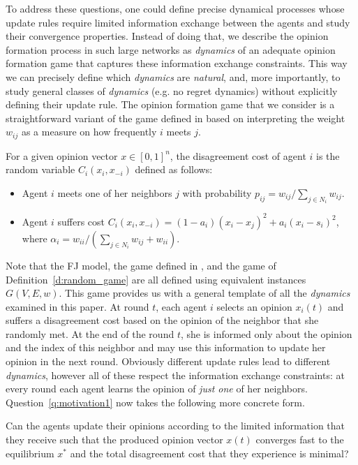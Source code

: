 To address these questions, one could define precise dynamical processes whose
update rules require limited information exchange between the agents and study
their convergence properties. Instead of doing that, we describe the opinion
formation process in such large networks as \emph{dynamics} of an adequate
opinion formation game that captures these information exchange constraints.
This way we can precisely define which \emph{dynamics} are \emph{natural}, and,
more importantly, to study general classes of \emph{dynamics} (e.g. no regret
dynamics) without explicitly defining their update rule.  The opinion formation
game that we consider is a straightforward variant of the game defined in
\cite{BKO11} based on interpreting the weight $w_{ij}$ as a measure on how
frequently $i$ meets $j$.
%
\begin{definition}\label{d:random_game}
  For a given opinion vector $x \in [0,1]^n$, the disagreement cost of agent
  $i$ is the random variable $C_i(x_i,x_{-i})$ defined as follows:
  \begin{itemize}
    \item Agent $i$ meets one of her neighbors $j$ with probability $p_{ij}=
      w_{ij}/\sum_{j\in N_i}w_{ij}$.
    \item Agent $i$ suffers cost $C_i(x_i , x_{-i}) = (1-a_i)(x_i-x_j)^2 +
      a_i(x_i-s_i)^2$, where $\alpha_i = w_{ii}/(\sum_{j\in
        N_i}w_{ij}+w_{ii})$.
  \end{itemize}
\end{definition}
%
Note that the FJ model, the game defined in \cite{BKO11}, and the game of
Definition~\ref{d:random_game} are all defined using equivalent instances
$G(V,E,w)$.  This game provides us with a general template of all the \emph{dynamics}
examined in this paper.  At round $t$, each agent $i$ selects an opinion
$x_i(t)$ and suffers a disagreement cost based on the opinion of the neighbor
that she randomly met.  At the end of the round $t$, she is informed only about
the opinion and the index of this neighbor and may use this information to
update her opinion in the next round.  Obviously different update rules lead to
different \emph{dynamics}, however all of these respect the information
exchange constraints: at every round each agent learns the opinion of \emph{just
  one} of her neighbors.  Question~\ref{q:motivation1} now takes the following
more concrete form.

\begin{question}\label{q:motivation2}
  Can the agents update their opinions according to the limited information
  that they receive such that the produced opinion vector $x(t)$ converges
  fast to the equilibrium $x^*$ and the total disagreement cost that they
  experience is minimal?
%
\end{question}

